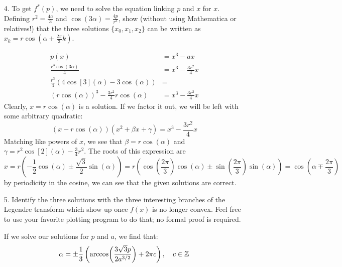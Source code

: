 \documentclass[a4paper,twoside]{article}
\begin{document}
\begin{itemize}
    \item[4.] To get $ f^*(p) $, we need to solve the equation linking $ p $ and $ x $ for $ x $. Defining $ r^2 = \frac{4a}{3} $ and $ \cos(3 \alpha) = \frac{4p}{r^3} $, show (without using Mathematica or relatives!) that the three solutions $ \{x_0, x_1, x_2\} $ can be written as $ x_k = r \cos(\alpha + \frac{2 \pi}{3} k) $.
        \begin{problem}
            \begin{align}
                p(x) &= x^3 - ax \\
                \frac{r^3 \cos(3 \alpha)}{4} &= x^3 - \frac{3 r^2}{4} x \\
                \frac{r^3}{4} \left( 4 \cos[3](\alpha) - 3 \cos(\alpha) \right) &= \\
                (r \cos(\alpha))^3 - \frac{3 r^2}{4}r\cos(\alpha) &= x^3 - \frac{3 r^2}{4} x
            \end{align}
            Clearly, $ x = r \cos(\alpha) $ is a solution. If we factor it out, we will be left with some arbitrary quadratic:
            \begin{equation}
                (x - r \cos(\alpha))(x^2 + \beta x + \gamma) = x^3 - \frac{3r^2}{4} x
            \end{equation}
            Matching like powers of $ x $, we see that $ \beta = r \cos(\alpha) $ and $ \gamma = r^2 \cos[2](\alpha) - \frac{3}{4} r^2 $. The roots of this expression are
            \begin{equation}
                x = r\left( -\frac{1}{2} \cos(\alpha) \pm \frac{\sqrt{3}}{2} \sin(\alpha)  \right) = r \left( \cos(\frac{2 \pi}{3}) \cos(\alpha) \pm \sin(\frac{2 \pi}{3}) \sin(\alpha) \right) = \cos(\alpha \mp \frac{2 \pi}{3})
            \end{equation}
            by periodicity in the cosine, we can see that the given solutions are correct.
        \end{problem}
    \item[5.] Identify the three solutions with the three interesting branches of the Legendre transform which show up once $ f(x) $ is no longer convex. Feel free to use your favorite plotting program to do that; no formal proof is required.
        \begin{problem}
            If we solve our solutions for $ p $ and $ a $, we find that:
            \begin{equation}
                \alpha = \pm\frac{1}{3} \left( \arccos(\frac{3 \sqrt{3} p}{2 a^{3/2}}) + 2 \pi c \right) \qc c \in \Z

\end{equation}
\end{problem}
\end{itemize}
\end{document}

